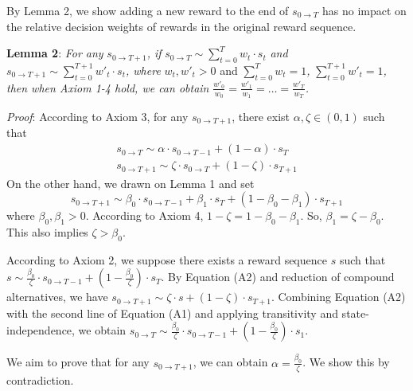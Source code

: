 By Lemma 2, we show adding a new reward to the end of
\(s_{0\rightarrow T}\) has no impact on the relative decision weights of
rewards in the original reward sequence.

\noindent \textbf{Lemma 2}: \emph{For any}
\(s_{0\rightarrow T+1}\)\emph{, if}
\(s_{0\rightarrow T}\sim \sum_{t=0}^T w_t \cdot s_t\) \emph{and}
\(s_{0\rightarrow T+1} \sim \sum_{t=0}^{T+1} w'_t\cdot s_t\)\emph{,
where} \(w_t, w'_t>0\) and \(\sum_{t=0}^Tw_t=1\)\emph{,}
\(\sum_{t=0}^{T+1}w'_t=1\)\emph{, then when Axiom 1-4 hold, we can
obtain} \(\frac{w'_0}{w_0}=\frac{w'_1}{w_1}=…=\frac{w'_T}{w_T}\)\emph{.}

\noindent \emph{Proof}: According to Axiom 3, for any
\(s_{0\rightarrow T+1}\), there exist \(\alpha,\zeta \in (0,1)\) such
that\[\tag{A1}
\begin{aligned}
s_{0 \rightarrow T}\sim\alpha\cdot s_{0 \rightarrow T-1} + (1-\alpha)\cdot s_T \\
s_{0\rightarrow T+1} \sim \zeta\cdot s_{0\rightarrow T} + (1-\zeta)\cdot s_{T+1}
\end{aligned}
\]On the other hand, we drawn on Lemma 1 and set\[\tag{A2}
s_{0\rightarrow T+1} \sim \beta_0\cdot s_{0 \rightarrow T-1} + \beta_1\cdot s_T + (1-\beta_0-\beta_1)\cdot s_{T+1}
\]where \(\beta_0, \beta_1 > 0\). According to Axiom 4,
\(1-\zeta=1-\beta_0-\beta_1\). So, \(\beta_1=\zeta-\beta_0\). This also
implies \(\zeta > \beta_0\).

According to Axiom 2, we suppose there exists a reward sequence \(s\)
such that
\(s \sim \frac{\beta_0}{\zeta}\cdot s_{0 \rightarrow T-1} + (1-\frac{\beta_0}{\zeta})\cdot s_T\).
By Equation (A2) and reduction of compound alternatives, we have
\(s_{0\rightarrow T+1}\sim \zeta \cdot s + (1-\zeta)\cdot s_{T+1}\).
Combining Equation (A2) with the second line of Equation (A1) and
applying transitivity and state-independence, we obtain
\(s_{0\rightarrow T} \sim \frac{\beta_0}{\zeta}\cdot s_{0 \rightarrow T-1} + (1-\frac{\beta_0}{\zeta})\cdot s_1\).

We aim to prove that for any \(s_{0\rightarrow T+1}\), we can obtain
\(\alpha=\frac{\beta_0}{\zeta}\). We show this by contradiction.

